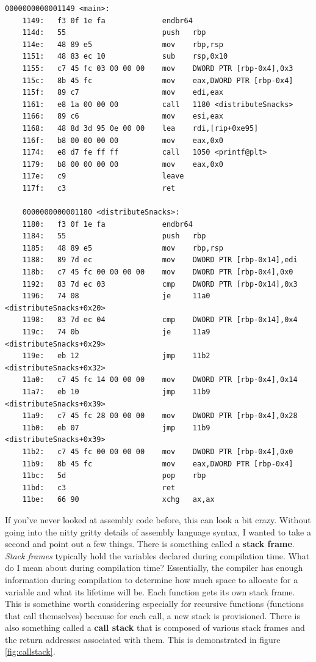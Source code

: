 \documentclass[../main.tex]{subfiles}
\begin{document}
	\begin{lstlisting}[language={[x86masm]Assembler}]
	0000000000001149 <main>:
	1149:	f3 0f 1e fa          	endbr64 
	114d:	55                   	push   rbp
	114e:	48 89 e5             	mov    rbp,rsp
	1151:	48 83 ec 10          	sub    rsp,0x10
	1155:	c7 45 fc 03 00 00 00 	mov    DWORD PTR [rbp-0x4],0x3
	115c:	8b 45 fc             	mov    eax,DWORD PTR [rbp-0x4]
	115f:	89 c7                	mov    edi,eax
	1161:	e8 1a 00 00 00       	call   1180 <distributeSnacks>
	1166:	89 c6                	mov    esi,eax
	1168:	48 8d 3d 95 0e 00 00 	lea    rdi,[rip+0xe95]
	116f:	b8 00 00 00 00       	mov    eax,0x0
	1174:	e8 d7 fe ff ff       	call   1050 <printf@plt>
	1179:	b8 00 00 00 00       	mov    eax,0x0
	117e:	c9                   	leave  
	117f:	c3                   	ret 
	
	0000000000001180 <distributeSnacks>:
	1180:	f3 0f 1e fa          	endbr64 
	1184:	55                   	push   rbp
	1185:	48 89 e5             	mov    rbp,rsp
	1188:	89 7d ec             	mov    DWORD PTR [rbp-0x14],edi
	118b:	c7 45 fc 00 00 00 00 	mov    DWORD PTR [rbp-0x4],0x0
	1192:	83 7d ec 03          	cmp    DWORD PTR [rbp-0x14],0x3
	1196:	74 08                	je     11a0 <distributeSnacks+0x20>
	1198:	83 7d ec 04          	cmp    DWORD PTR [rbp-0x14],0x4
	119c:	74 0b                	je     11a9 <distributeSnacks+0x29>
	119e:	eb 12                	jmp    11b2 <distributeSnacks+0x32>
	11a0:	c7 45 fc 14 00 00 00 	mov    DWORD PTR [rbp-0x4],0x14
	11a7:	eb 10                	jmp    11b9 <distributeSnacks+0x39>
	11a9:	c7 45 fc 28 00 00 00 	mov    DWORD PTR [rbp-0x4],0x28
	11b0:	eb 07                	jmp    11b9 <distributeSnacks+0x39>
	11b2:	c7 45 fc 00 00 00 00 	mov    DWORD PTR [rbp-0x4],0x0
	11b9:	8b 45 fc             	mov    eax,DWORD PTR [rbp-0x4]
	11bc:	5d                   	pop    rbp
	11bd:	c3                   	ret    
	11be:	66 90                	xchg   ax,ax
	\end{lstlisting}
	
	If you've never looked at assembly code before, this can look a bit crazy.  Without going into the nitty gritty details of assembly language syntax, I wanted to take a second and point out a few things.  There is something called a \textbf{stack frame}.  \textit{Stack frames} typically hold the variables declared during compilation time.  What do I mean about during compilation time?  Essentially, the compiler has enough information during compilation to determine how much space to allocate for a variable and what its lifetime will be.  Each function gets its own stack frame.  This is somethine worth considering especially for recursive functions (functions that call themselves) because for each call, a new stack is provisioned.  There is also something called a \textbf{call stack} that is composed of various stack frames and the return addresses associated with them.  This is demonstrated in figure \ref{fig:callstack}.
	
\end{document}
